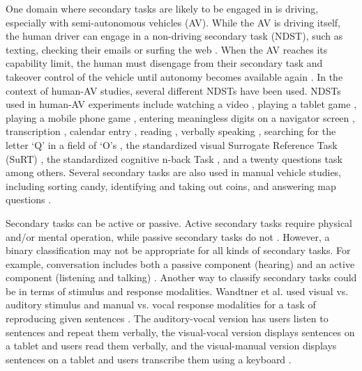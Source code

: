 \documentclass[preprint,12pt, a4paper]{elsarticle}
\begin{document}
One domain where secondary tasks are likely to be engaged in is driving, especially with semi-autonomous vehicles (AV). While the AV is driving itself, the human driver can engage in a non-driving secondary task (NDST), such as texting, checking their emails or surfing the web \cite{van2017priming}. When the AV reaches its capability limit, the human must disengage from their secondary task and takeover control of the vehicle until autonomy becomes available again \cite{merat2012highly}. In the context of human-AV studies, several different NDSTs have been used. NDSTs used in human-AV experiments include watching a video \cite{mok2015emergency, ito2016time, nakajima2017effects}, playing a tablet game \cite{mok2017tunneled, epple2018sooner}, playing a mobile phone game \cite{nakajima2017effects, melcher2015take}, entering meaningless digits on a navigator screen \cite{ito2016time}, transcription \cite{van2017priming, wandtner2018non, wandtner2018effects}, calendar entry \cite{van2017priming},  reading \cite{naujoks2014effect}, verbally speaking \cite{nakajima2017effects, wandtner2018non, wandtner2018effects}, searching for the letter `Q' in a field of `O's \cite{azevedo2020context, azevedo2020comparing, azevedo2021internal}, the standardized visual Surrogate Reference Task (SuRT) \cite{radlmayr2014traffic, feldhutter2017duration, gold2013take}, the standardized cognitive n-back Task \cite{radlmayr2014traffic}, and a twenty questions task \cite{merat2012highly} among others. Several secondary tasks are also used in manual vehicle studies, including sorting candy, identifying and taking out coins, and answering map questions \cite{kern2008cars}. \vspace{2mm}


Secondary tasks can be active or passive. Active secondary tasks require physical and/or mental operation, while passive secondary tasks do not \cite{nakajima2017effects}. However, a binary classification may not be appropriate for all kinds of secondary tasks. For example, conversation includes both a passive component (hearing) and an active component (listening and talking) \cite{nakajima2017effects}. Another way to classify secondary tasks could be in terms of stimulus and response modalities. Wandtner et al. used visual vs. auditory stimulus and manual vs. vocal response modalities for a task of reproducing given sentences \cite{wandtner2018effects}. The auditory-vocal version has users listen to sentences and repeat them verbally, the visual-vocal version displays sentences on a tablet and users read them verbally, and the visual-manual version displays sentences on a tablet and users transcribe them using a keyboard \cite{wandtner2018effects}. \vspace{2mm}
\end{document}
